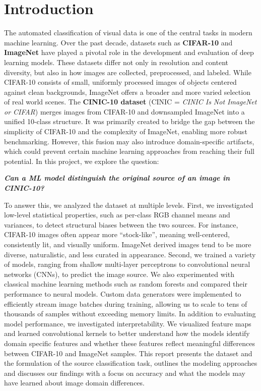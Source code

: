 \section{Introduction}

The automated classification of visual data is one of the central tasks in modern machine learning. Over the past decade, datasets such as \textbf{CIFAR-10} and \textbf{ImageNet} have played a 
pivotal role in the development and evaluation of deep learning models. These datasets differ not only in resolution and content diversity, but also in how images are collected, 
preprocessed, and labeled. While CIFAR-10 consists of small, uniformly processed images of objects centered against clean backgrounds, ImageNet offers a broader and more varied selection 
of real world scenes.
The \textbf{CINIC-10 dataset} (CINIC = \textit{CINIC Is Not ImageNet or CIFAR}) merges images from CIFAR-10 and downsampled ImageNet into a unified 10-class structure. 
It was primarily created to bridge the gap between the simplicity of CIFAR-10 and the complexity of ImageNet, enabling more robust benchmarking. However, this fusion may also 
introduce domain-specific artifacts, which could prevent certain machine learning approaches from reaching their full potential.
In this project, we explore the question:
\begin{center}
\textbf{\textit{Can a ML model distinguish the original source of an image in CINIC-10?}}
\end{center}
To answer this, we analyzed the dataset at multiple levels. First, we investigated low-level statistical properties, such as per-class RGB channel means and variances, to detect structural 
biases between the two sources. For instance, CIFAR-10 images often appear more ``stock-like'', meaning well-centered, consistently lit, and visually uniform. ImageNet derived images tend 
to be more diverse, naturalistic, and less curated in appearance.
Second, we trained a variety of models, ranging from shallow multi-layer perceptrons to convolutional neural networks (CNNs), to predict the image source. 
We also experimented with classical machine learning methods such as random forests and compared their performance to neural models. 
Custom data generators were implemented to efficiently stream image batches during training, allowing us to scale to tens of thousands of samples without exceeding memory limits.
In addition to evaluating model performance, we investigated interpretability. We visualized feature maps and learned convolutional kernels to better understand how the models identify 
domain specific features and whether these features reflect meaningful differences between CIFAR-10 and ImageNet samples.
This report presents the dataset and the formulation of the source classification task, outlines the modeling approaches and discusses our findings with a 
focus on accuracy and what the models may have learned about image domain differences.


